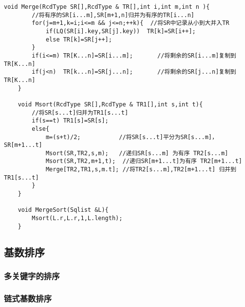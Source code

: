 \documentclass[UTF8]{ctexart}
\begin{document}
\begin{lstlisting}[style=v1]
    void Merge(RcdType SR[],RcdType & TR[],int i,int m,int n ){
        //将有序的SR[i...m],SR[m+1,n]归并为有序的TR[i...n]
        for(j=m+1,k=i;i<=m && j<=n;++k){  //将SR中记录从小到大并入TR
            if(LQ(SR[i].key,SR[j].key))  TR[k]=SR[i++];
            else TR[k]=SR[j++];
        }
        if(i<=m) TR[K...n]=SR[i...m];       //将剩余的SR[i...m]复制到TR[K...n]
        if(j<n)  TR[k...n]=SR[j...n];       //将剩余的SR[j...n]复制到TR[K...n]
    }

    void Msort(RcdType SR[],RcdType & TR1[],int s,int t){
        //将SR[s...t]归并为TR1[s...t]
        if(s==t) TR1[s]=SR[s];
        else{
            m=(s+t)/2;           //将SR[s...t]平分为SR[s...m]，SR[m+1...t]
            Msort(SR,TR2,s,m);   //递归SR[s...m] 为有序 TR2[s...m]  
            Msort(SR,TR2,m+1,t);  //递归SR[m+1...t]为有序 TR2[m+1...t] 
            Merge[TR2,TR1,s,m.t]; //将TR2[s...m],TR2[m+1...t] 归并到 TR1[s...t] 
        }
    }

    void MergeSort(Sqlist &L){
        Msort(L.r,L.r,1,L.length);
    }

\end{lstlisting}



\subsection{基数排序}

\subsubsection{多关键字的排序}

\subsubsection{链式基数排序}
 
\end{document}
